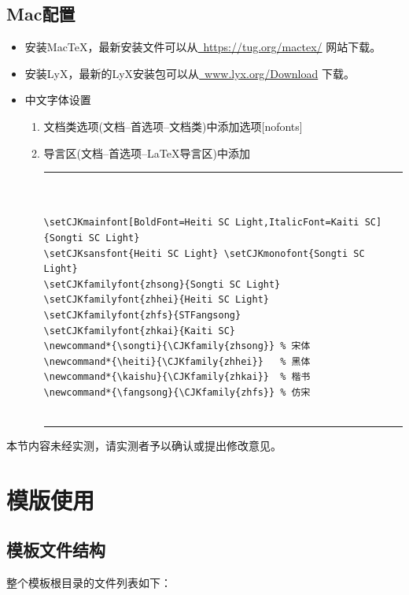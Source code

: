 \documentclass[twoside,longtitle]{LZUthesis}
\begin{document}
\section{Mac配置}
\begin{itemize}
\item 安装Mac\TeX{}，最新安装文件可以从\href{https://tug.org/mactex/}{~https://tug.org/mactex/}
网站下载。
\item 安装LyX，最新的LyX安装包可以从\href{http://www.lyx.org/Download}{~www.lyx.org/Download} 下载。
\item 中文字体设置

\begin{enumerate}
\item 文档类选项(文档--首选项--文档类)中添加选项{[}nofonts{]}
\item 导言区(文档--首选项--\LaTeX{}导言区)中添加


\tiny
\begin{center}
\hrule


\begin{verbatim}


\setCJKmainfont[BoldFont=Heiti SC Light,ItalicFont=Kaiti SC]   {Songti SC Light}
\setCJKsansfont{Heiti SC Light} \setCJKmonofont{Songti SC Light}
\setCJKfamilyfont{zhsong}{Songti SC Light}
\setCJKfamilyfont{zhhei}{Heiti SC Light}
\setCJKfamilyfont{zhfs}{STFangsong}
\setCJKfamilyfont{zhkai}{Kaiti SC}
\newcommand*{\songti}{\CJKfamily{zhsong}} % 宋体
\newcommand*{\heiti}{\CJKfamily{zhhei}}   % 黑体
\newcommand*{\kaishu}{\CJKfamily{zhkai}}  % 楷书
\newcommand*{\fangsong}{\CJKfamily{zhfs}} % 仿宋


\end{verbatim}


\hrule
\end{center}
\normalsize

\end{enumerate}
\end{itemize}


本节内容未经实测，请实测者予以确认或提出修改意见。


\chapter{模版使用}


\section{模板文件结构\label{sec:files}}

整个模板根目录的文件列表如下：
\end{document}
